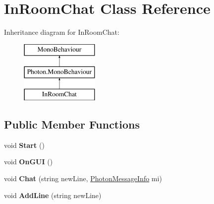 \hypertarget{class_in_room_chat}{}\section{In\+Room\+Chat Class Reference}
\label{class_in_room_chat}
Inheritance diagram for In\+Room\+Chat\+:\begin{figure}[H]
\begin{center}
\leavevmode
\includegraphics[height=3.000000cm]{class_in_room_chat}
\end{center}
\end{figure}
\subsection*{Public Member Functions}
\begin{DoxyCompactItemize}
\item 
void {\bfseries Start} ()\hypertarget{class_in_room_chat_a6b783c7f6c334ee0b0c1384f83928fab}{}\label{class_in_room_chat_a6b783c7f6c334ee0b0c1384f83928fab}

\item 
void {\bfseries On\+G\+UI} ()\hypertarget{class_in_room_chat_af9fe56fdb21db3868eda31175fe5512c}{}\label{class_in_room_chat_af9fe56fdb21db3868eda31175fe5512c}

\item 
void {\bfseries Chat} (string new\+Line, \hyperlink{class_photon_message_info}{Photon\+Message\+Info} mi)\hypertarget{class_in_room_chat_a4d96349205f511958033febb9f30461f}{}\label{class_in_room_chat_a4d96349205f511958033febb9f30461f}

\item 
void {\bfseries Add\+Line} (string new\+Line)\hypertarget{class_in_room_chat_ad942cd6f67bcf966adcf976fbd3055bd}{}\label{class_in_room_chat_ad942cd6f67bcf966adcf976fbd3055bd}

\end{DoxyCompactItemize}
